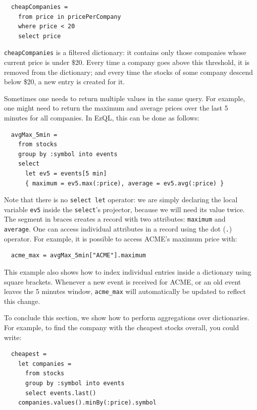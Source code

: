 \begin{lstlisting}
  cheapCompanies =
    from price in pricePerCompany
    where price < 20
    select price
\end{lstlisting}

\verb=cheapCompanies= is a filtered dictionary: it contains only those
companies whose current price is under \$20. Every time a company goes
above this threshold, it is removed from the dictionary; and every
time the stocks of some company descend below \$20, a new entry is
created for it.

Sometimes one needs to return multiple values in the same query. For
example, one might need to return the maximum and average prices over
the last 5 minutes for all companies. In EzQL, this can be done as
follows:

\begin{lstlisting}
  avgMax_5min =
    from stocks
    group by :symbol into events
    select
      let ev5 = events[5 min]
      { maximum = ev5.max(:price), average = ev5.avg(:price) }
\end{lstlisting}

Note that there is no \verb=select let= operator: we are simply
declaring the local variable \verb=ev5= inside the \verb=select='s
projector, because we will need its value twice. The segment in braces
creates a record with two attributes: \verb=maximum= and
\verb=average=. One can access individual attributes in a record using
the dot (\verb=.=) operator. For example, it is possible to access
ACME's maximum price with:

\begin{lstlisting}
  acme_max = avgMax_5min["ACME"].maximum
\end{lstlisting}

This example also shows how to index individual entries inside a
dictionary using square brackets. Whenever a new event is received for
ACME, or an old event leaves the 5 minutes window, \verb=acme_max=
will automatically be updated to reflect this change.

To conclude this section, we show how to perform aggregations over
dictionaries. For example, to find the company with the cheapest
stocks overall, you could write:

\begin{lstlisting}
  cheapest =
    let companies =
      from stocks
      group by :symbol into events
      select events.last()
    companies.values().minBy(:price).symbol
\end{lstlisting}

